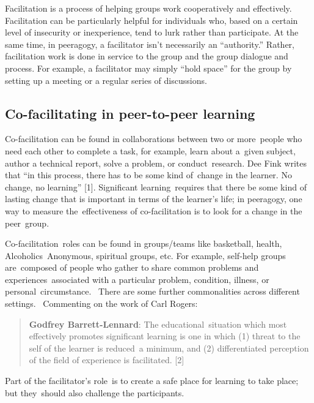 Facilitation is a process of helping groups work cooperatively and
effectively. Facilitation can be particularly helpful for individuals
who, based on a certain level of insecurity or inexperience, tend to
lurk rather than participate. At the same time, in peeragogy, a
facilitator isn't necessarily an ``authority.'' Rather, facilitation
work is done in service to the group and the group dialogue and process.
For example, a facilitator may simply ``hold space'' for the group by
setting up a meeting or a regular series of discussions.

\hypertarget{co-facilitating-in-peer-to-peer-learning}{%
\subsection{Co-facilitating in peer-to-peer
learning}\label{co-facilitating-in-peer-to-peer-learning}}

Co-facilitation can be found in collaborations between two or
more~people who need each other to complete a task, for example, learn
about a~given subject, author a technical report, solve a problem, or
conduct~research. Dee Fink writes that ``in this process, there has to
be some kind of~change in the learner. No change, no learning''
{{[}1{]}}. Significant learning~requires that there be some kind of
lasting change that is important in terms of the learner's life; in
peeragogy, one way to measure the~effectiveness of co-facilitation is to
look for a change in the peer~group.

Co-facilitation~roles can be found in groups/teams like basketball,
health, Alcoholics~Anonymous, spiritual groups, etc. For example,
self-help groups are~composed of people who gather to share common
problems and experiences~associated with a particular problem,
condition, illness, or personal~circumstance.~ There are some further
commonalities across different settings.~ Commenting on the work of Carl
Rogers:

\begin{quote}
\textbf{Godfrey Barrett-Lennard}: The educational~situation which most
effectively promotes significant learning is one in which (1) threat to
the self of the learner is reduced~a minimum, and (2) differentiated
perception of the field of experience is facilitated. {{[}2{]}}
\end{quote}

Part of the facilitator's role~is to create a safe place for learning to
take place; but they~should also challenge the participants.

